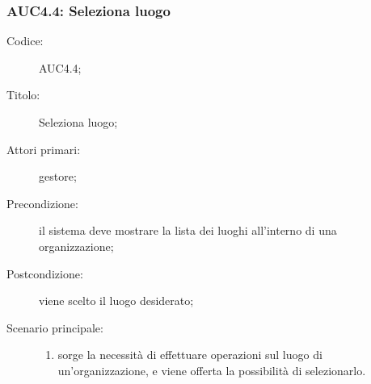 \subsubsection{AUC4.4: Seleziona luogo}%
\label{subs:AUC4.4}
\begin{description}
  \item[Codice:] AUC4.4;
  \item[Titolo:] Seleziona luogo;
  \item[Attori primari:] gestore;
  \item[Precondizione:] il sistema deve mostrare la lista dei luoghi all'interno di una organizzazione;
  \item[Postcondizione:] viene scelto il luogo desiderato;
  \item[Scenario principale:]
  \begin{enumerate}
    \item sorge la necessità di effettuare operazioni sul luogo di un'organizzazione, e viene offerta la possibilità di selezionarlo.
  \end{enumerate}
\end{description}


